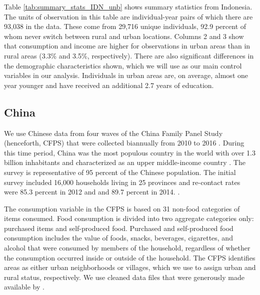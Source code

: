 Table \ref{tab:summary_stats_IDN_unb} shows summary statistics from Indonesia. The units of observation in this table are individual-year pairs of which there are 93,038 in the data. These come from 29,716 unique individuals, 92.9 percent of whom never switch between rural and urban locations. 
Columns 2 and 3 show that consumption and income are higher for observations in urban areas than in rural areas (3.3\% and 3.5\%, respectively). There are also significant differences in the demographic characteristics shown, which we will use as our main control variables in our analysis. Individuals in urban areas are, on average, almost one year younger and have received an additional 2.7 years of education.





\subsection{China}\label{subsec:China-data}
We use Chinese data from four waves of the China Family Panel Study (henceforth, CFPS) that  were collected biannually from 2010 to 2016 \citep{ISSS2015}. During this time period, China was the most populous country in the world with over 1.3 billion inhabitants and characterized as an upper middle-income country \citep{worldbank2024wdi}.
The survey is representative of 95 percent of the Chinese population. The initial survey included 16,000 households living in 25 provinces and re-contact rates were 85.3 percent in 2012 and and 89.7 percent in 2014.
 \citep{lagakosMigrationCostsObservational2020}.

The consumption variable in the CFPS is based on 31 non-food categories of items consumed. Food consumption is divided into two aggregate categories only: purchased items and self-produced food. Purchased and self-produced food consumption includes the value of foods, snacks, beverages, cigarettes, and alcohol that were consumed by members of the household, regardless of whether the consumption occurred inside or outside of the household. 
The CFPS identifies areas as either urban neighborhoods or villages, which we use to assign urban and rural status, respectively. 
We use cleaned data files that were generously made available by \cite{lagakosMigrationCostsObservational2020}.

